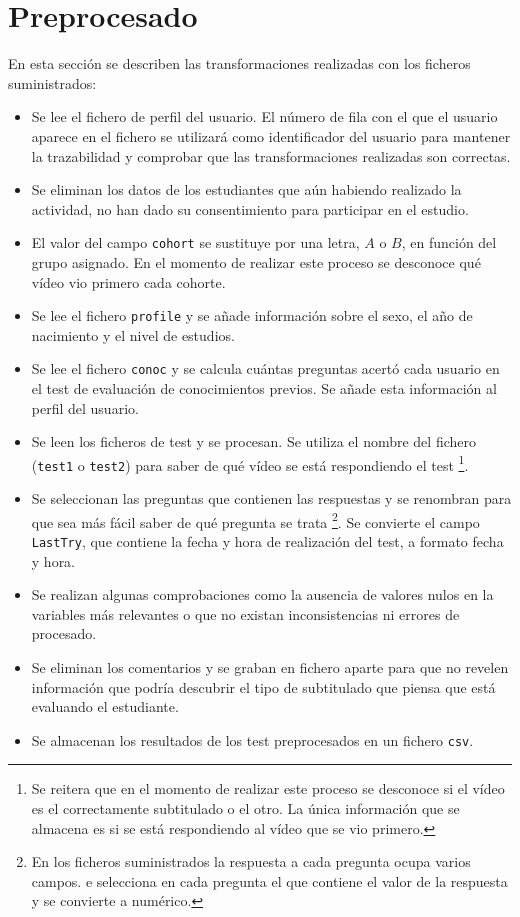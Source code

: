 \documentclass[
  12pt,
  a4paper,
  extrafontsizes,
  onecolumn,
  openright]{memoir}
\newlength{\rf}
\begin{document}
\hypertarget{sec-preprocesado}{%
\section{Preprocesado}\label{sec-preprocesado}}

En esta sección se describen las transformaciones realizadas con los
ficheros suministrados:

\begin{itemize}
\item
  Se lee el fichero de perfil del usuario. El número de fila con el que
  el usuario aparece en el fichero se utilizará como identificador del
  usuario para mantener la trazabilidad y comprobar que las
  transformaciones realizadas son correctas.
\item
  Se eliminan los datos de los estudiantes que aún habiendo realizado la
  actividad, no han dado su consentimiento para participar en el
  estudio.
\item
  El valor del campo \texttt{cohort} se sustituye por una letra, \(A\) o
  \(B\), en función del grupo asignado. En el momento de realizar este
  proceso se desconoce qué vídeo vio primero cada cohorte.
\item
  Se lee el fichero \texttt{profile} y se añade información sobre el
  sexo, el año de nacimiento y el nivel de estudios.
\item
  Se lee el fichero \texttt{conoc} y se calcula cuántas preguntas acertó
  cada usuario en el test de evaluación de conocimientos previos. Se
  añade esta información al perfil del usuario.
\item
  Se leen los ficheros de test y se procesan. Se utiliza el nombre del
  fichero (\texttt{test1} o \texttt{test2}) para saber de qué vídeo se
  está respondiendo el test \footnote{Se reitera que en el momento de
    realizar este proceso se desconoce si el vídeo es el correctamente
    subtitulado o el otro. La única información que se almacena es si se
    está respondiendo al vídeo que se vio primero.}.
\item
  Se seleccionan las preguntas que contienen las respuestas y se
  renombran para que sea más fácil saber de qué pregunta se trata
  \footnote{En los ficheros suministrados la respuesta a cada pregunta
    ocupa varios campos. e selecciona en cada pregunta el que contiene
    el valor de la respuesta y se convierte a numérico.}. Se convierte
  el campo \texttt{LastTry}, que contiene la fecha y hora de realización
  del test, a formato fecha y hora.
\item
  Se realizan algunas comprobaciones como la ausencia de valores nulos
  en la variables más relevantes o que no existan inconsistencias ni
  errores de procesado.
\item
  Se eliminan los comentarios y se graban en fichero aparte para que no
  revelen información que podría descubrir el tipo de subtitulado que
  piensa que está evaluando el estudiante.
\item
  Se almacenan los resultados de los test preprocesados en un fichero
  \texttt{csv}.
\end{itemize}
\end{document}
